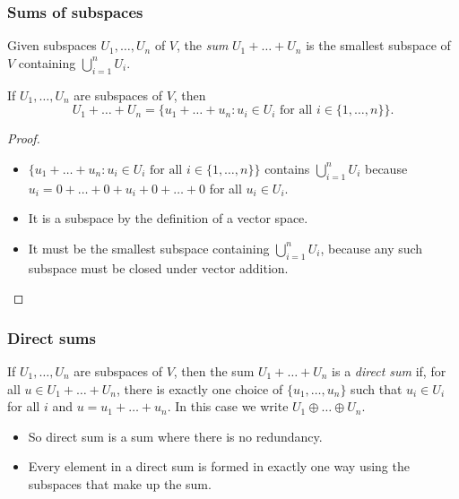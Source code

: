 \documentclass[handout]{beamer}
\begin{document}
\begin{frame}
\frametitle{Sums of subspaces}
\begin{definition}
Given subspaces $U_1,\ldots,U_n$ of $V$, the \emph{sum} $U_1+\ldots +U_n$ is the smallest subspace of $V$ containing $\bigcup_{i=1}^n U_i$.
\end{definition}

\begin{lemma}
If $U_1,\ldots,U_n$ are subspaces of $V$, then 
\[U_1+\ldots +U_n = \{u_1+\ldots +u_n: u_i\in U_i\text{ for all }i\in\{1,\ldots,n\}\}.\]
\end{lemma}
\begin{proof}
\begin{itemize}
\item $\{u_1+\ldots +u_n: u_i\in U_i\text{ for all }i\in\{1,\ldots,n\}\}$ contains $\bigcup_{i=1}^n U_i$ because $u_i = 0+\ldots +0 + u_i + 0 +\ldots + 0$ for all $u_i\in U_i$. 
\item It is a subspace by the definition of a vector space. 
\item It must be the smallest subspace containing $\bigcup_{i=1}^n U_i$, because any such subspace must be closed under vector addition.
\end{itemize} 
\end{proof}
\end{frame}

\begin{frame}
\frametitle{Direct sums}
\begin{definition}
If $U_1,\ldots,U_n$ are subspaces of $V$, then the sum $U_1+\ldots +U_n$ is a \emph{direct sum} if, for all $u\in U_1+\ldots +U_n$, there is exactly one choice of $\{u_1,\ldots, u_n\}$ such that $u_i\in U_i$ for all $i$ and $u = u_1+\ldots +u_n$. In this case we write $U_1\oplus\ldots\oplus U_n$.
\end{definition}
\vspace{0.5cm}
\begin{itemize}
\item So direct sum is a sum where there is no redundancy. 
\vspace{0.5cm}
\item Every element in a direct sum is formed in exactly one way using the subspaces that make up the sum. 
\end{itemize}
\end{frame}
\end{document}
